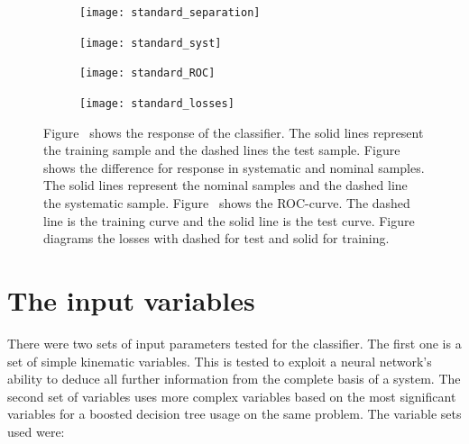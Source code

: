 \begin{figure}[htbp]
    \centering
    \begin{subfigure}[b]{0.48\textwidth}
        \texttt{[image: standard\_separation]}
        \caption{}
        \label{fig:simple:final:sepa}
    \end{subfigure}
\quad
    \begin{subfigure}[b]{0.48\textwidth}
        \texttt{[image: standard\_syst]}
        \caption{}
        \label{fig:simple:final:syst}
    \end{subfigure}

    \begin{subfigure}[b]{0.48\textwidth}
		\texttt{[image: standard\_ROC]}
		\caption{}
		\label{fig:simple:final:roc}
	\end{subfigure}
\quad
	\begin{subfigure}[b]{0.48\textwidth}
		\texttt{[image: standard\_losses]}
		\caption{}
		\label{fig:simple:final:loss}
	\end{subfigure}
    \caption{Figure~ shows the response of the classifier. The solid lines represent the training sample and the dashed lines the test sample. Figure~ shows the difference for response in systematic and nominal samples. The solid lines represent the nominal samples and the dashed line the systematic sample. Figure~ shows the ROC-curve. The dashed line is the training curve and the solid line is the test curve. Figure~ diagrams the losses with dashed for test and solid for training.}
	\label{fig:simple:final}
\end{figure}


\section{The input variables}

There were two sets of input parameters tested for the classifier.
The first one is a set of simple kinematic variables. This is tested to exploit a neural network's ability to deduce all further information from the complete basis of a system.
The second set of variables uses more complex variables based on the most significant variables for a boosted decision tree usage on the same problem.
The variable sets used were:



